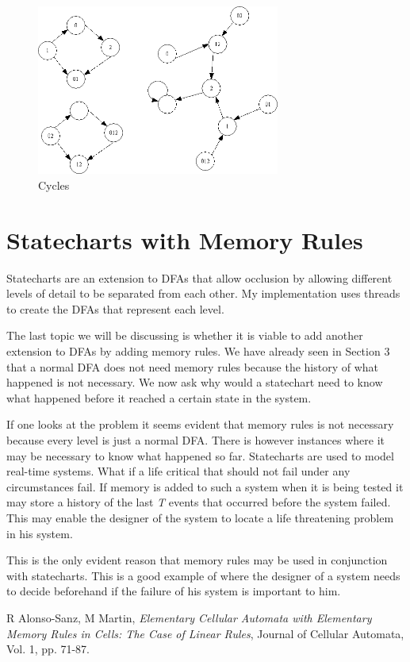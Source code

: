 \documentclass[a4paper,11pt,titlepage]{article}
\begin{document}
\begin{figure}[htbp]
   \centering
   \includegraphics[width=8cm]{cycle.png}
   \caption{Cycles}
   \label{Figure:cycle}
\end{figure}
\newpage
\section{Statecharts with Memory Rules}
Statecharts are an extension to DFAs that allow occlusion by allowing different levels of detail to be separated from each other. My implementation uses threads to create the DFAs that represent each level.

The last topic we will be discussing is whether it is viable to add another extension to DFAs by adding memory rules. We have already seen in Section 3 that a normal DFA does not need memory rules because the history of what happened is not necessary. We now ask why would a statechart need to know what happened before it reached a certain state in the system.

If one looks at the problem it seems evident that memory rules is not necessary because every level is just a normal DFA. There is however instances where it may be necessary to know what happened so far. Statecharts are used to model real-time systems. What if a life critical that should not fail under any circumstances fail. If memory is added to such a system when it is being tested it may store a history of the last \emph{T} events that occurred before the system failed. This may enable the designer of the system to locate a life threatening problem in his system.

This is the only evident reason that memory rules may be used in conjunction with statecharts. This is a good example of where the designer of a system needs to decide beforehand if the failure of his system is important to him.

\begin{thebibliography}{9}
 R Alonso-Sanz, M Martin,
\emph{Elementary Cellular Automata with Elementary Memory Rules in Cells: The Case of Linear Rules}, Journal of Cellular Automata, Vol. 1, pp. 71-87.
\end{thebibliography}
\end{document}
